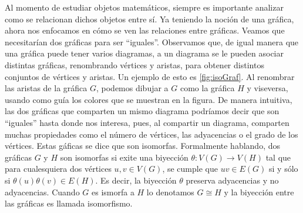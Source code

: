 Al momento de estudiar objetos matem\'aticos, siempre es importante analizar
como se relacionan dichos objetos entre s\'i. Ya teniendo la noci\'on de una
gr\'afica, ahora nos enfocamos en c\'omo se ven las relaciones entre gr\'aficas.
Veamos que necesitar\'ian dos gr\'aficas para ser ``iguales''. Observamos que,
de igual manera que una gr\'afica puede tener varios diagramas, a un diagrama se
le pueden asociar distintas gr\'aficas, renombrando v\'ertices y aristas, para
obtener distintos conjuntos de v\'ertices y aristas. Un ejemplo de esto es
\cref{fig:isoGraf}. Al renombrar las aristas de la gr\'afica $G$, podemos
dibujar a $G$ como la gr\'afica $H$ y viseversa, usando como gu\'ia los colores
que se muestran en la figura. De manera intuitiva, las dos gr\'aficas que
comparten un mismo diagrama podr\'iamos decir que son ``iguales'' hasta donde
nos interesa, pues, al compartir un diagrama, comparten muchas propiedades como
el n\'umero de v\'ertices, las adyacencias o el grado de los v\'ertices. Estas
g\'aficas se dice que son isomorfas. Formalmente hablando, dos gr\'aficas $G$ y
$H$ son isomorfas si exite una biyecci\'on $\theta: V(G) \rightarrow V(H)$ tal
que para cualesquiera dos v\'ertices $u, v \in V(G)$, se cumple que $uv \in
E(G)$ si y s\'olo si $\theta(u)\theta(v) \in E(H)$. Es decir, la biyecci\'on
$\theta$ preserva adyacencias y no adyacencias. Cuando $G$ es ismorfa a $H$ lo
denotamos $G \cong H$ y la biyecci\'on entre las gr\'aficas es llamada
isomorfismo.

